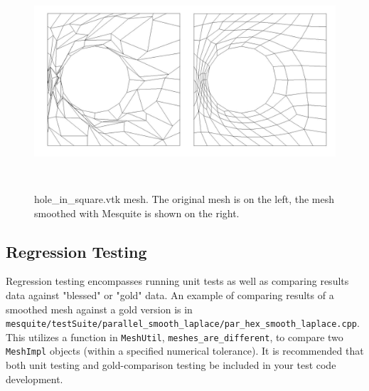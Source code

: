 \begin{figure}[htbp]
\begin{center}
    \includegraphics[height=80mm]{figures/hole_in_square}
    \caption{hole\_in\_square.vtk mesh. The original mesh is on the left, the mesh smoothed with
    Mesquite is shown on the right.}
    \label{fig:hole}
\end{center}
\end{figure}



\subsection{Regression Testing}
\label{sec:RegressionTesting}
Regression testing encompasses
running unit tests as well as comparing results data against "blessed"
or "gold" data.  An example of comparing results of a smoothed mesh
against a gold version is in
\texttt{mesquite/testSuite/parallel\_smooth\_laplace/par\_hex\_smooth\_laplace.cpp}.
This utilizes a function in \texttt{MeshUtil}, \texttt{meshes\_are\_different}, to compare
two \texttt{MeshImpl} objects (within a specified numerical tolerance).  It is
recommended that both unit testing and gold-comparison testing be
included in your test code development.
